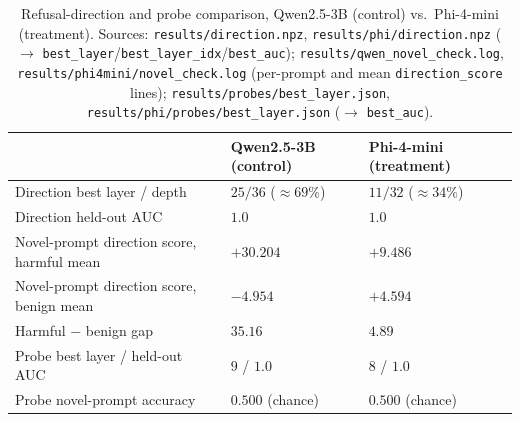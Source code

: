 \documentclass[11pt,letterpaper]{article}
\begin{document}
\begin{table}[htbp]
\centering
\caption{Refusal-direction and probe comparison, Qwen2.5-3B (control) vs.\ Phi-4-mini
  (treatment). Sources: \texttt{results/direction.npz}, \texttt{results/phi/direction.npz}
  ($\to$ \texttt{best\_layer}/\texttt{best\_layer\_idx}/\texttt{best\_auc}); \texttt{results/qwen\_novel\_check.log},
  \texttt{results/phi4mini/novel\_check.log} (per-prompt and mean \texttt{direction\_score}
  lines); \texttt{results/probes/best\_layer.json}, \texttt{results/phi/probes/best\_layer.json}
  ($\to$ \texttt{best\_auc}).}
\label{tab:direction}
\begin{tabular}{p{6cm}p{4cm}p{4cm}}
\toprule
 & Qwen2.5-3B (control) & Phi-4-mini (treatment) \\
\midrule
Direction best layer / depth & $25/36$ ($\approx 69\%$) & $11/32$ ($\approx 34\%$) \\
Direction held-out AUC & $1.0$ & $1.0$ \\
Novel-prompt direction score, harmful mean & $\mathbf{+30.204}$ & $\mathbf{+9.486}$ \\
Novel-prompt direction score, benign mean & $\mathbf{-4.954}$ & $\mathbf{+4.594}$ \\
Harmful $-$ benign gap & $\mathbf{35.16}$ & $\mathbf{4.89}$ \\
Probe best layer / held-out AUC & $9$ / $1.0$ & $8$ / $1.0$ \\
Probe novel-prompt accuracy & $0.500$ (chance) & $0.500$ (chance) \\
\bottomrule
\end{tabular}
\end{table}
\end{document}
